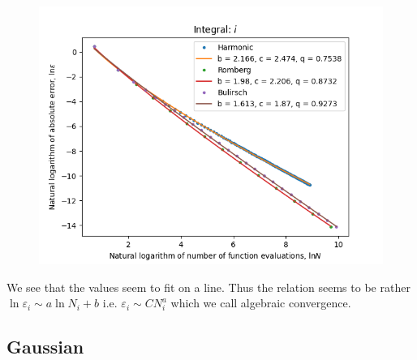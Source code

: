 \begin{figure}[H]
\centering
\begin{minipage}{0.45\textwidth}
\centering
\includegraphics[scale=0.45]{romberg_plots/circle_area_hp_log_log_pow_fit_trend.png}
\end{minipage}
\end{figure}

We see that the values seem to fit on a line. Thus the relation seems to be rather \(\ln \varepsilon_i \sim a\ln N_i + b \) i.e. \(\varepsilon_i \sim C N_i^a\) which we call algebraic convergence.\\

\subsection{Gaussian}

